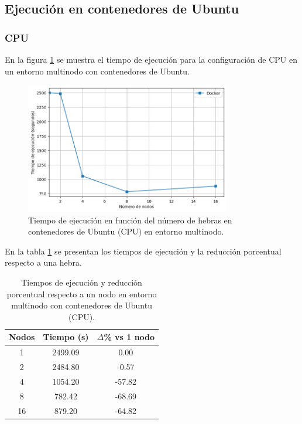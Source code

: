 \subsection{Ejecución en contenedores de Ubuntu}
\subsubsection{CPU}

En la figura \ref{fig:multi-node_ubuntu_docker_time} se muestra el tiempo de ejecución para la configuración de CPU en un entorno multinodo con contenedores de Ubuntu.

\begin{figure}[H]
    \centering
    \includegraphics[width=0.8\textwidth]{imagenes/cap5/multi-node_ubuntu_docker_time.png}
    \caption{Tiempo de ejecución en función del número de hebras en contenedores de Ubuntu (CPU) en entorno multinodo.}
    \label{fig:multi-node_ubuntu_docker_time}
\end{figure}

En la tabla \ref{tab:multi-node_ubuntu_docker} se presentan los tiempos de ejecución y la reducción porcentual respecto a una hebra.

\begin{table}[ht]
    \centering
    \begin{tabular}{|c|c|c|}
        \hline
        \textbf{Nodos} & \textbf{Tiempo (s)} & \textbf{$\Delta$\% vs 1 nodo} \\
        \hline
        1              & 2499.09             & 0.00                          \\
        2              & 2484.80             & -0.57                         \\
        4              & 1054.20             & -57.82                        \\
        8              & 782.42              & -68.69                        \\
        16             & 879.20              & -64.82                        \\
        \hline
    \end{tabular}
    \caption{Tiempos de ejecución y reducción porcentual respecto a un nodo en entorno multinodo con contenedores de Ubuntu (CPU).}
    \label{tab:multi-node_ubuntu_docker}
\end{table}

